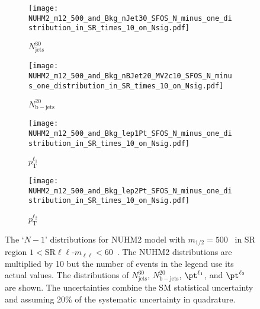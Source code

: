 \begin{figure}[htbp]
    \begin{center}
        \begin{subfigure}[b]{0.48\textwidth}
            \texttt{[image: NUHM2\_m12\_500\_and\_Bkg\_nJet30\_SFOS\_N\_minus\_one\_distribution\_in\_SR\_times\_10\_on\_Nsig.pdf]}
            \caption{$N^{30}_{\mathrm{jets}}$}
            \label{fig:event_nuhm2_m12_500_nJet30_SFOS}
        \end{subfigure}
        \begin{subfigure}[b]{0.48\textwidth}
            \texttt{[image: NUHM2\_m12\_500\_and\_Bkg\_nBJet20\_MV2c10\_SFOS\_N\_minus\_one\_distribution\_in\_SR\_times\_10\_on\_Nsig.pdf]}
            \caption{$N^{20}_{\mathrm{b-jets}}$}
            \label{fig:event_nuhm2_m12_500_nBJet20_SFOS}
        \end{subfigure}
        \begin{subfigure}[b]{0.48\textwidth}
            \texttt{[image: NUHM2\_m12\_500\_and\_Bkg\_lep1Pt\_SFOS\_N\_minus\_one\_distribution\_in\_SR\_times\_10\_on\_Nsig.pdf]}
            \caption{$p^{\ell_1}_{\mathrm{T}}$}
            \label{fig:event_nuhm2_m12_500_lep1Pt_SFOS}
        \end{subfigure}
        \begin{subfigure}[b]{0.48\textwidth}
            \texttt{[image: NUHM2\_m12\_500\_and\_Bkg\_lep2Pt\_SFOS\_N\_minus\_one\_distribution\_in\_SR\_times\_10\_on\_Nsig.pdf]}
            \caption{$p^{\ell_2}_{\mathrm{T}}$}
            \label{fig:event_nuhm2_m12_500_lep2Pt_SFOS}
        \end{subfigure}
    \end{center}
    \caption{The `$N-1$' distributions for NUHM2 model with $m_{1/2} = 500$~{\GeV} in SR region $1 < $SR$\ell \ell$-$m_{\ell \ell} < 60$~{\GeV}.
    The NUHM2 distributions are multiplied by 10 but the number of events in the legend use its actual values.
    The distributions of $N_\mathrm{jets}^{30}$, $N_\mathrm{b-jets}^{20}$, $\pt^{\ell_{1}}$, and $\pt^{\ell_{2}}$ are shown.
    The uncertainties combine the SM statistical uncertainty and assuming 20\% of the systematic uncertainty in quadrature.}
    \label{fig:event_nuhm2_kinematic_in_SR_SFOS_1}
\end{figure}

